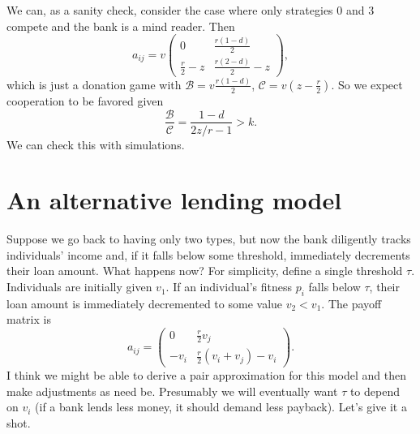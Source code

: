 \documentclass[13pt]{amsart}
\newcommand{\B}{\mathcal{B}}
\newcommand{\C}{\mathcal{C}}
\begin{document}
We can, as a sanity check, consider the case where only strategies $0$ and $3$ compete and the bank is a mind reader.
Then
\begin{equation}
    a_{ij} = v
    \begin{pmatrix}
        0 & \frac{r(1-d)}{2} \\
        \frac{r}{2} - z & \frac{r(2-d)}{2} - z
    \end{pmatrix},
\end{equation}
which is just a donation game with $\B = v\frac{r(1-d)}{2}$, $\C = v(z - \frac{r}{2})$.
So we expect cooperation to be favored given
\begin{equation}
    \frac{\B}{\C} = \frac{1-d}{2z/r - 1} > k.
\end{equation}
We can check this with simulations.

\section{An alternative lending model}

Suppose we go back to having only two types, but now the bank diligently tracks individuals' income and, if it falls below some threshold, immediately decrements their loan amount.
What happens now?
For simplicity, define a single threshold $\tau$.
Individuals are initially given $v_1$.
If an individual's fitness $p_i$ falls below $\tau$, their loan amount is immediately decremented to some value $v_2 < v_1$.
The payoff matrix is
\begin{equation}
    a_{ij} =
    \begin{pmatrix}
        0 & \frac{r}{2} v_j \\
        -v_i & \frac{r}{2}(v_i + v_j) - v_i
    \end{pmatrix}.
\end{equation}
I think we might be able to derive a pair approximation for this model and then make adjustments as need be.
Presumably we will eventually want $\tau$ to depend on $v_i$ (if a bank lends less money, it should demand less payback).
Let's give it a shot.
\end{document}
